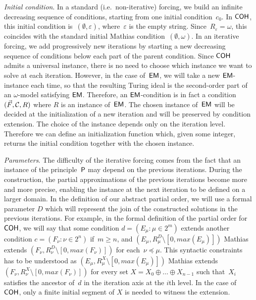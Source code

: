 \emph{Initial condition}. 
In a standard (i.e.\ non-iterative) forcing, we build an infinite decreasing sequence
of conditions, starting from one initial condition~$c_0$. In $\operatorname{\sf{COH}}$, this initial condition is~$(\emptyset, \varepsilon)$,
where~$\varepsilon$ is the empty string. Since~$R_\varepsilon = \omega$, this coincides with the standard
initial Mathias condition~$(\emptyset, \omega)$.
In an iterative forcing, we add progressively new iterations by starting a new decreasing sequence of conditions
below each part of the parent condition. Since $\operatorname{\sf{COH}}$ admits a universal instance, there is no need to choose
which instance we want to solve at each iteration. However, in the case of~$\operatorname{\sf{EM}}$, we will take a new $\operatorname{\sf{EM}}$-instance
each time, so that the resulting Turing ideal is the second-order part of an $\omega$-model satisfying $\operatorname{\sf{EM}}$.
Therefore, an $\operatorname{\sf{EM}}$-condition is in fact a condition~$(\vec{F}, \mathcal{C}, R)$ where $R$ is an instance of~$\operatorname{\sf{EM}}$.
The chosen instance of~$\operatorname{\sf{EM}}$ will be decided at the initialization of a new iteration and will be preserved
by condition extension. The choice of the instance depends only on the iteration level. Therefore we can
define an initialization function which, given some integer, returns the initial condition together with the chosen instance.
\smallskip

\emph{Parameters}.
The difficulty of the iterative forcing comes from the fact that an instance of the principle~$\mathsf{P}$
may depend on the previous iterations. During the construction, the partial approximations
of the previous iterations become more and more precise, enabling the instance at the next iteration to be
defined on a larger domain. In the definition of our abstract partial order, we will use a formal parameter $D$
which will represent the join of the constructed solutions in the previous iterations.
For example, in the formal definition of the partial order for~$\operatorname{\sf{COH}}$, we will say that
some condition $d = (E_\mu : \mu \in 2^m)$ extends another condition $c = (F_\nu : \nu \in 2^n)$ if~$m \geq n$,
and $(E_\mu, R^D_\mu \setminus [0, max(E_\mu)])$ 
Mathias extends $(F_\nu, R^D_\nu \setminus [0,max(F_\nu)])$ for each~$\nu \preceq \mu$. 
This syntactic constraints has to be understood as $(E_\mu, R^X_\mu \setminus [0, max(E_\mu)])$ 
Mathias extends $(F_\nu, R^X_\nu \setminus [0,max(F_\nu)])$
for every set $X = X_0 \oplus \dots \oplus X_{n-1}$ such that~$X_i$ satisfies the ancestor of~$d$ in the iteration axis
at the $i$th level. In the case of $\operatorname{\sf{COH}}$, only a finite initial segment of $X$ is needed to witness
the extension.

